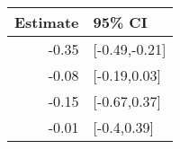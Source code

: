 \begin{tabular}{rl}
  \hline
Estimate & 95\% CI \\ 
  \hline
-0.35 & [-0.49,-0.21] \\ 
  -0.08 & [-0.19,0.03] \\ 
  -0.15 & [-0.67,0.37] \\ 
  -0.01 & [-0.4,0.39] \\ 
   \hline
\end{tabular}

